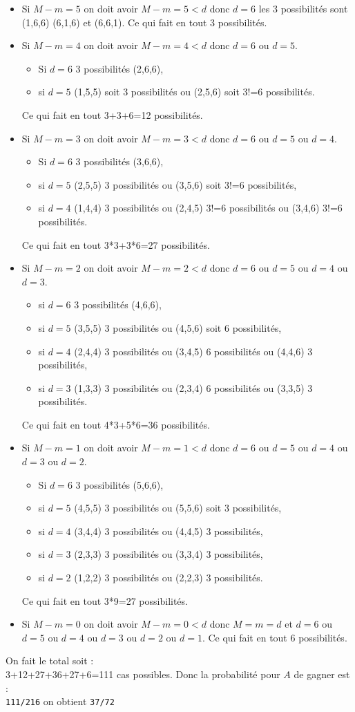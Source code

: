 \documentclass[a4paper,11pt]{book}
\begin{document}
\begin{itemize}
\item Si $M-m=5$ on doit avoir $M-m=5<d$ donc $d=6$  les 3 possibilit\'es sont
(1,6,6) (6,1,6) et (6,6,1). Ce qui fait en tout 3 possibilit\'es.
\item Si $M-m=4$ on doit avoir $M-m=4<d$ donc $d=6$ ou $d=5$. 
 \begin{itemize}
\item Si  $d=6$  3 possibilit\'es (2,6,6),
\item si $d=5$ (1,5,5) soit 3 possibilit\'es ou (2,5,6) soit 3!=6 
possibilit\'es. 
\end{itemize}
Ce qui fait en tout 3+3+6=12 possibilit\'es.
\item Si $M-m=3$ on doit avoir $M-m=3<d$ donc $d=6$ ou $d=5$ ou $d=4$. 
\begin{itemize}
\item Si $d=6$ 3 possibilit\'es (3,6,6), 
\item si $d=5$ (2,5,5) 3 possibilit\'es ou (3,5,6) soit 3!=6 possibilit\'es,
\item si $d=4$ (1,4,4) 3 possibilit\'es ou (2,4,5) 3!=6 possibilit\'es ou 
(3,4,6) 3!=6 possibilit\'es.
 \end{itemize}
Ce qui fait en tout 3*3+3*6=27 possibilit\'es.
\item Si $M-m=2$ on doit avoir $M-m=2<d$ donc $d=6$ ou $d=5$ ou $d=4$ ou $d=3$.
\begin{itemize}
\item si $d=6$ 3 possibilit\'es (4,6,6), 
\item si $d=5$ (3,5,5) 3 possibilit\'es ou (4,5,6) soit 6 possibilit\'es, 
\item si $d=4$ (2,4,4) 3 possibilit\'es ou (3,4,5) 6 possibilit\'es ou (4,4,6) 
3 possibilit\'es,
 \item si $d=3$ (1,3,3) 3 possibilit\'es ou (2,3,4) 6 possibilit\'es ou (3,3,5) 3 possibilit\'es. 
\end{itemize}
Ce qui fait en tout 4*3+5*6=36 possibilit\'es.
 \item Si $M-m=1$ on doit avoir $M-m=1<d$ donc $d=6$ ou $d=5$ ou $d=4$ ou $d=3$ ou 
$d=2$. 
\begin{itemize}
\item Si $d=6$ 3 possibilit\'es (5,6,6), 
\item si $d=5$ (4,5,5) 3 possibilit\'es ou (5,5,6) soit 3 possibilit\'es, 
\item si $d=4$ (3,4,4) 3 possibilit\'es ou (4,4,5) 3 possibilit\'es, 
\item si $d=3$ (2,3,3) 3 possibilit\'es ou 
(3,3,4) 3 possibilit\'es,
\item  si  $d=2$  (1,2,2) 3 possibilit\'es ou (2,2,3) 3 possibilit\'es.
\end{itemize}
 Ce qui fait en tout 3*9=27 possibilit\'es.
\item  Si $M-m=0$ on doit avoir $M-m=0<d$ donc $M=m=d$ et $d=6$ ou $d=5$ ou $d=4$ ou $d=3$ ou $d=2$ ou $d=1$.  Ce qui fait en tout 6 possibilit\'es.
\end{itemize}
On fait le total soit :\\
3+12+27+36+27+6=111 cas possibles.
Donc la probabilit\'e pour $A$ de gagner est :\\
{\tt 111/216} on obtient {\tt 37/72}
\end{document}
